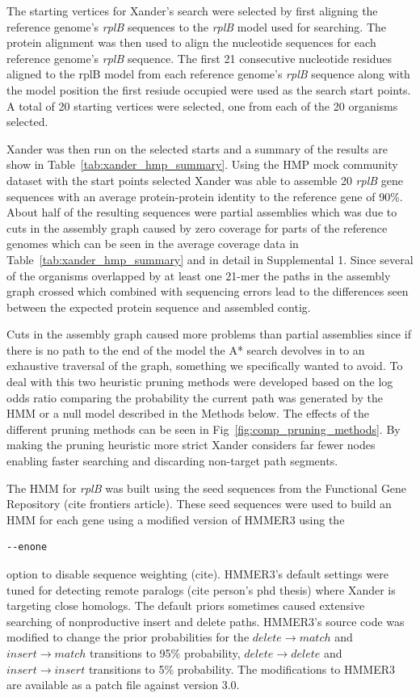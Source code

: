 \documentclass[10pt]{bmc_article}
\newenvironment{bmcformat}{\begin{raggedright}\baselineskip20pt\sloppy\setboolean{publ}{false}}{\end{raggedright}\baselineskip20pt\sloppy}
\begin{document}
\begin{bmcformat}
The starting vertices for Xander's search were selected by first aligning the reference genome's \emph{rplB} sequences to the \emph{rplB} model used for searching.  The protein alignment was then used to align the nucleotide sequences for each reference genome's \emph{rplB} sequence.  The first 21 consecutive nucleotide residues aligned to the rplB model from each reference genome's \emph{rplB} sequence along with the model position the first resiude occupied were used as the search start points.  A total of 20 starting vertices were selected, one from each of the 20 organisms selected.

Xander was then run on the selected starts and a summary of the results are show in Table~\ref{tab:xander_hmp_summary}.  Using the HMP mock community dataset with the start points selected Xander was able to assemble 20 \emph{rplB} gene sequences with an average protein-protein identity to the reference gene of 90\%.  About half of the resulting sequences were partial assemblies which was due to cuts in the assembly graph caused by zero coverage for parts of the reference genomes which can be seen in the average coverage data in Table~\ref{tab:xander_hmp_summary} and in detail in Supplemental 1.  Since several of the organisms overlapped by at least one 21-mer the paths in the assembly graph crossed which combined with sequencing errors lead to the differences seen between the expected protein sequence and assembled contig.

Cuts in the assembly graph caused more problems than partial assemblies since if there is no path to the end of the model the A* search devolves in to an exhaustive traversal of the graph, something we specifically wanted to avoid.  To deal with this two heuristic pruning methods were developed based on the log odds ratio comparing the probability the current path was generated by the HMM or a null model described in the Methods below.  The effects of the different pruning methods can be seen in Fig~\ref{fig:comp_pruning_methods}.  By making the pruning heuristic more strict Xander considers far fewer nodes enabling faster searching and discarding non-target path segments.

The HMM for \emph{rplB} was built using the seed sequences from the Functional Gene Repository (cite frontiers article).  These seed sequences were used to build an HMM for each gene using a modified version of HMMER3 using the \begin{verbatim}--enone\end{verbatim} option to disable sequence weighting (cite). HMMER3's default settings were tuned for detecting remote paralogs (cite person's phd thesis) where Xander is targeting close homologs.  The default priors sometimes caused extensive searching of nonproductive insert and delete paths. HMMER3's source code was modified to change the prior probabilities for the $delete \rightarrow match$ and $insert \rightarrow match$ transitions to 95\% probability, $delete \rightarrow delete$ and $insert \rightarrow insert$ transitions to 5\% probability.  The modifications to HMMER3 are available as a patch file against version 3.0.


\end{bmcformat}
\end{document}
